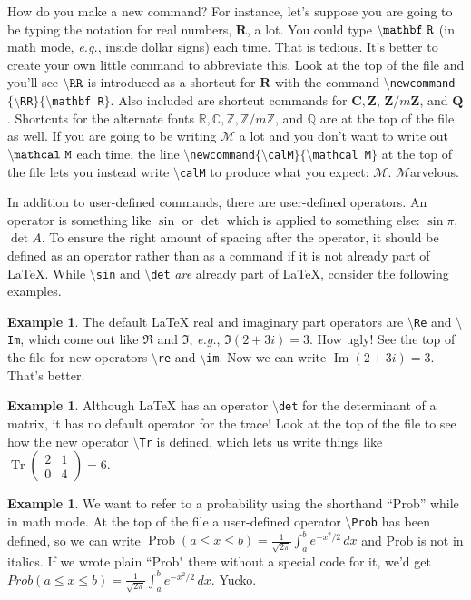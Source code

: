 \documentclass[12pt,letterpaper]{amsart}
\newcommand{\RR}{\mathbf R}
\newcommand{\CC}{\mathbf C}
\newcommand{\ZZ}{\mathbf Z}
\newcommand{\ZZn}[1]{\ZZ/{#1}\ZZ}
\newcommand{\QQ}{\mathbf Q}
\newcommand{\rr}{\mathbb R}
\newcommand{\cc}{\mathbb C}
\newcommand{\zz}{\mathbb Z}
\newcommand{\zzn}[1]{\zz/{#1}\zz}
\newcommand{\qq}{\mathbb Q}
\newcommand{\calM}{\mathcal M}
\newcommand{\latex}{\LaTeX}
\newcommand{\sm}{\setminus}
\newcommand{\pln}[1]{$\sm${\tt #1}}
\newcommand{\Tr}{\operatorname {Tr}}
\newcommand{\Prob}{\operatorname {Prob}}
\newcommand{\im}{\operatorname {Im}}
\theoremstyle{plain}
\theoremstyle{definition}
\newtheorem{example}[theorem]{Example}
\numberwithin{equation}{section}
\begin{document}
How do you make a new command?  For instance, 
let's suppose you are going to be typing 
the notation for real numbers, $\RR$, a lot.  
You could type $\tt {\sm}mathbf \ R$ 
(in math mode, {\it e.g.}, inside dollar signs) 
each time.  That is tedious.  It's better to 
create your own little command to abbreviate this. 
Look at the top of the file and you'll see 
$\tt {\sm}RR$ is introduced as a shortcut for $\RR$ 
with the command 
{\tt $\sm$newcommand$\{\sm$RR$\}\{\sm$mathbf R$\}$}. 
Also included are
shortcut commands for $\CC, \ZZ$, $\ZZn{m}$, and $\QQ$. 
Shortcuts for the alternate fonts 
$\rr, \cc, \zz, \zzn{m}$, and $\qq$ are at the top of the file as well. 
If you are going to be writing $\mathcal M$ a  
lot and you don't want to write out $\tt {\sm}mathcal \ M$
each time, 
the line 
{\tt $\sm$newcommand$\{\sm$calM$\}\{\sm$mathcal M$\}$}
at the top of the file 
lets you instead write 
{\tt $\sm$calM} to produce 
what you expect: $\calM$.  $\calM$arvelous.



In addition to user-defined commands, there are 
user-defined operators. An operator is something 
like $\sin$ or $\det$ which 
is applied to something else: $\sin \pi$, 
$\det A$. To ensure the right amount of spacing 
after the operator, it should be defined as an operator 
rather than as a command if it is not already part of \latex.
While {\tt $\sm$sin} and {\tt $\sm$det} {\it are} already part of \latex{}, 
consider the following examples.

\begin{example}
The default \latex{} real and imaginary part operators 
are 
\pln{Re} and \pln{Im}, 
which come out like 
$\Re$ and $\Im$, {\it e.g.}, $\Im(2+3i) = 3$.  How ugly!  
See the top of the file for new operators 
\pln{re} and \pln{im}. 
Now we can write $\im(2+3i) = 3$.  That's better.
\end{example}

\begin{example}
Although 
\latex{} has an operator 
\pln{det} 
for the determinant of a matrix, 
it has no default operator for the trace! 
Look at the top of the file to see how the new operator 
\pln{Tr} is defined, which lets us write things like 
$\Tr (\begin{smallmatrix}2&1\\0&4\end{smallmatrix}) = 6$.
\end{example}


\begin{example}
We want to refer to a probability using the shorthand ``Prob'' 
while in math mode.  At the top of the file a user-defined 
operator 
\pln{Prob} 
has been defined, so we can write 
$\Prob(a \leq x \leq b) = \frac{1}{\sqrt{2\pi}}\int_a^b e^{-x^2/2}\,dx$ 
and Prob is not in italics.  If we wrote plain ``Prob" there 
without a special code for it, we'd get
$Prob(a \leq x \leq b) = \frac{1}{\sqrt{2\pi}}\int_a^b e^{-x^2/2}\,dx$. 
Yucko.
\end{example}
\end{document}
